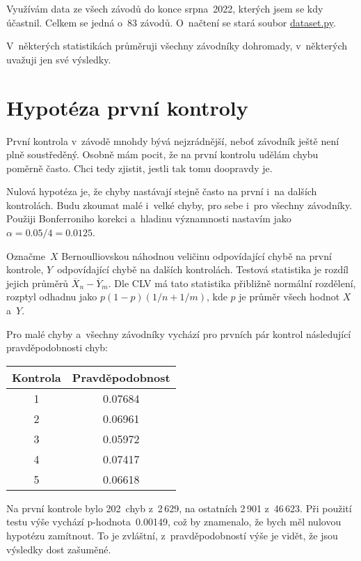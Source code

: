 \documentclass[a4paper,11pt]{article}
\begin{document}
Využívám data ze všech závodů do konce srpna~2022, kterých jsem se kdy účastnil.
Celkem se jedná o~83 závodů. O~načtení se stará soubor
\href{https://github.com/kulisak12/mistake-stats/blob/main/dataset.py}{dataset.py}.

V~některých statistikách průměruji všechny závodníky dohromady, v~některých
uvažuji jen své výsledky.
\pagebreak

\section*{Hypotéza první kontroly}

První kontrola v~závodě mnohdy bývá nejzrádnější, neboť závodník ještě není plně
soustředěný. Osobně mám pocit, že na první kontrolu udělám chybu poměrně často.
Chci tedy zjistit, jestli tak tomu doopravdy je.

Nulová hypotéza je, že chyby nastávají stejně často na první i~na dalších
kontrolách. Budu zkoumat malé i~velké chyby, pro sebe i~pro všechny závodníky.
Použiji Bonferroniho korekci a~hladinu významnosti nastavím jako
$\alpha = 0.05 / 4 = 0.0125$.

Označme~$X$ Bernoulliovskou náhodnou veličinu odpovídající chybě na první
kontrole, $Y$~odpovídající chybě na dalších kontrolách. Testová statistika je
rozdíl jejich průměrů $\overline{X}_n - \overline{Y}_m$. Dle CLV má tato
statistika přibližně normální rozdělení, rozptyl odhadnu jako
$p (1-p) (1/n + 1/m)$, kde $p$ je průměr všech hodnot $X$ a~$Y$.

Pro malé chyby a~všechny závodníky vychází pro prvních pár kontrol následující
pravděpodobnosti chyb:

\begin{tabular}{c | c}
    Kontrola & Pravděpodobnost \\
    \hline
    1        & 0.07684         \\
    2        & 0.06961         \\
    3        & 0.05972         \\
    4        & 0.07417         \\
    5        & 0.06618         \\
\end{tabular}

Na první kontrole bylo 202~chyb z~2\,629, na ostatních 2\,901 z~46\,623. Při
použití testu výše vychází p-hodnota~0.00149, což by znamenalo, že bych měl
nulovou hypotézu zamítnout. To je zvláštní, z~pravděpodobností výše je vidět, že
jsou výsledky dost zašuměné.
\end{document}
